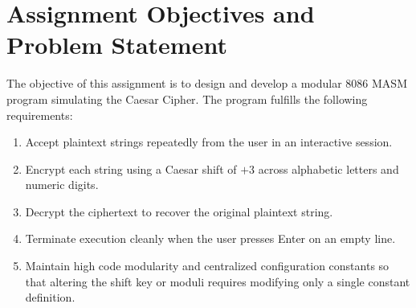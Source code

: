 \documentclass[11pt,a4paper]{article}
\begin{document}
\newpage

\begin{abstract}
This laboratory assignment report documents the design, implementation, and testing of a Caesar cipher simulation on the 16-bit Intel 8086 microprocessor using Microsoft Macro Assembler (MASM). The program implements full alphanumeric substitution: alphabetic letters undergo a $+3$ shift modulo 26, while decimal digits undergo a $+3$ shift modulo 10 (such that 8 maps to 1, and 9 maps to 2). Non-alphanumeric characters remain unmodified. The program architecture emphasizes modularity by encapsulating cipher transformations into dedicated subroutines (\texttt{encrypt\_char} and \texttt{decrypt\_char}) and centralizing configuration constants (\texttt{shift\_key}, \texttt{alpha\_mod}, \texttt{digit\_mod}) so that a single modification adjusts the entire system. An interactive loop accepts multiple inputs until terminated by an empty line (pressing Enter).
\end{abstract}

\vspace{0.4cm}

\section{Assignment Objectives and Problem Statement}
The objective of this assignment is to design and develop a modular 8086 MASM program simulating the Caesar Cipher. The program fulfills the following requirements:
\begin{enumerate}
    \item Accept plaintext strings repeatedly from the user in an interactive session.
    \item Encrypt each string using a Caesar shift of $+3$ across alphabetic letters and numeric digits.
    \item Decrypt the ciphertext to recover the original plaintext string.
    \item Terminate execution cleanly when the user presses Enter on an empty line.
    \item Maintain high code modularity and centralized configuration constants so that altering the shift key or moduli requires modifying only a single constant definition.
\end{enumerate}
\end{document}
